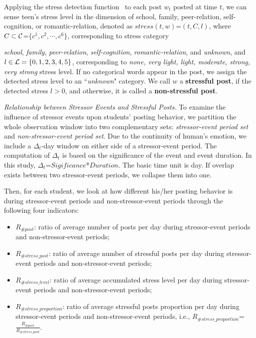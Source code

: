 Applying the stress detection function~\cite{HIS,LHJ} to each post $w_t$ posted at time $t$,
we can sense teen's stress level in the dimension of school, family, peer-relation, self-cognition, or romantic-relation, denoted as
$stress(t,w)$=$(t,C,l)$, where $C \subset {\cal C}$=$\{c^1,c^2,\cdots,c^6\}$,
corresponding to stress category {\emph{school}, \emph{family}, \emph{peer-relation},
\emph{self-cognition}, \emph{romantic-relation}, and \emph{unknown},
and $l \in {\cal L}=\{0,1,2,3,4,5\}$, corresponding to
\emph{none, very light, light, moderate, strong, very strong} stress level.
If no categorical words appear in the post, we assign the detected stress level
to an ``\emph{unknown}" category.
We call $w$  a \textbf{stressful post}, if the detected stress $l>0$,
and otherwise, it is called a \textbf{non-stressful post}.

\emph{Relationship between Stressor Events and Stressful Posts.}
To examine the influence of stressor events upon students' posting behavior,
we partition the whole observation window into two complementary sets:
\emph{stressor-event period set} and \emph{non-stressor-event period set}. %
Due to the continuity of human's emotion, we include a $\Delta_t$-day window on either side of
a stressor-event period. The computation of $\Delta_t$ is based on the significance of the event and
event duration. In this study, $\Delta_t$=$Sigificance$*$Duration$.
The basic time unit is day.
If overlap exists between two stressor-event periods,
we collapse them into one.

Then, for each student, we look at how different his/her posting behavior is during stressor-event periods and non-stressor-event periods through the following four
indicators:


\begin{itemize}
\item $R_{\#post}$: ratio of average number of posts per day during stressor-event periods and non-stressor-event periods;
\item $R_{\#stress\_post}$: ratio of average number of stressful posts per day during stressor-event periods and non-stressor-event periods;
\item $R_{\#stress\_level}$: ratio of average accumulated stress level per day during stressor-event periods and non-stressor-event periods;
\item $R_{\#stress\_proportion}$: ratio of average stressful posts proportion per day during stressor-event periods and non-stressor-event periods, i.e.,
$R_{\#stress\_proportion}$=$\frac{R_{\#post}}{R_{\#stress\_post}}$.
\end{itemize}

}

